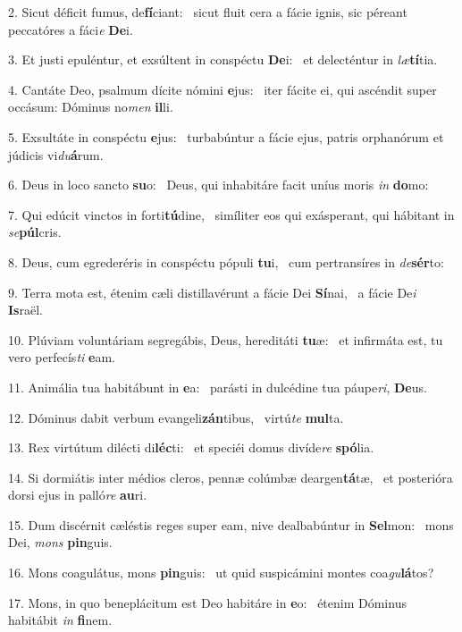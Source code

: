 2. Sicut déficit fumus, de\textbf{fí}ciant: \ast\  sicut fluit cera a fácie ignis, sic péreant peccatóres a fáci\textit{e} \textbf{De}i.\

3. Et justi epuléntur, et exsúltent in conspéctu \textbf{De}i: \ast\  et delecténtur in \textit{læ}\textbf{tí}tia.\

4. Cantáte Deo, psalmum dícite nómini \textbf{e}jus: \ast\  iter fácite ei, qui ascéndit super occásum: Dóminus no\textit{men} \textbf{il}li.\

5. Exsultáte in conspéctu \textbf{e}jus: \ast\  turbabúntur a fácie ejus, patris orphanórum et júdicis vi\textit{du}\textbf{á}rum.\

6. Deus in loco sancto \textbf{su}o: \ast\  Deus, qui inhabitáre facit uníus moris \textit{in} \textbf{do}mo:\

7. Qui edúcit vinctos in forti\textbf{tú}dine, \ast\  simíliter eos qui exásperant, qui hábitant in \textit{se}\textbf{púl}cris.\

8. Deus, cum egrederéris in conspéctu pópuli \textbf{tu}i, \ast\  cum pertransíres in \textit{de}\textbf{sér}to:\

9. Terra mota est, étenim cæli distillavérunt a fácie Dei \textbf{Sí}nai, \ast\  a fácie De\textit{i} \textbf{Is}raël.\

10. Plúviam voluntáriam segregábis, Deus, hereditáti \textbf{tu}æ: \ast\  et infirmáta est, tu vero perfecís\textit{ti} \textbf{e}am.\

11. Animália tua habitábunt in \textbf{e}a: \ast\  parásti in dulcédine tua páupe\textit{ri}, \textbf{De}us.\

12. Dóminus dabit verbum evangeli\textbf{zán}tibus, \ast\  virtú\textit{te} \textbf{mul}ta.\

13. Rex virtútum dilécti di\textbf{léc}ti: \ast\  et speciéi domus divíde\textit{re} \textbf{spó}lia.\

14. Si dormiátis inter médios cleros, pennæ colúmbæ deargen\textbf{tá}tæ, \ast\  et posterióra dorsi ejus in palló\textit{re} \textbf{au}ri.\

15. Dum discérnit cæléstis reges super eam, nive dealbabúntur in \textbf{Sel}mon: \ast\  mons Dei, \textit{mons} \textbf{pin}guis.\

16. Mons coagulátus, mons \textbf{pin}guis: \ast\  ut quid suspicámini montes coa\textit{gu}\textbf{lá}tos?\

17. Mons, in quo beneplácitum est Deo habitáre in \textbf{e}o: \ast\  étenim Dóminus habitábit \textit{in} \textbf{fi}nem.\

